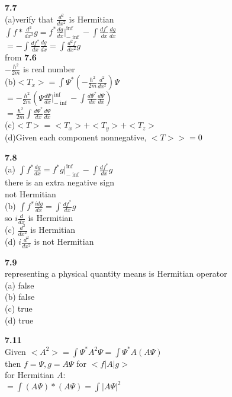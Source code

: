 \documentclass{article}
\begin{document}
\textbf{7.7}\\
(a)verify that $\frac{d^2}{dx^2}$ is Hermitian\\
$\int f* \frac{d^2}{dx^2}g = f^*\frac{dg}{dx}|^{\inf}_{-\inf} - \int \frac{df^*}{dx}\frac{dg}{dx}$\\
$ = - \int \frac{df^*}{dx}\frac{dg}{dx} = \int \frac{d^2f}{dx^2}g$\\
from \textbf{7.6}\\
$-\frac{\hbar^2}{2m}$ is real number\\
(b)$<T_x> = \int \Psi^*(-\frac{\hbar^2}{2m}\frac{d^2}{dx^2})\Psi$\\
$=-\frac{\hbar^2}{2m}(\Psi \frac{d\Psi}{dx}|^{\inf}_{-\inf} - \int \frac{d\Psi^*}{dx}\frac{d\Psi}{dx})$\\
$=\frac{\hbar^2}{2m}\int \frac{d\Psi^*}{dx}\frac{d\Psi}{dx}$\\
(c)$<T> = <T_x> + <T_y> + <T_z>$\\
(d)Given each component nonnegative, $<T> >=0$\\
\newline

\textbf{7.8}\\
(a) $\int f^*\frac{dg}{dx} = f^*g|^{\inf}_{-\inf} - \int \frac{df^*}{dx}g$\\
there is an extra negative sign\\
not Hermitian\\
(b) $\int f^*\frac{idg}{dx} = \int \frac{df^*}{dx}g$\\
so $i\frac{d}{dx}$ is Hermitian\\
(c) $\frac{d^2}{dx^2}$ is Hermitian\\
(d) $i\frac{d^2}{dx^2}$ is not Hermitian\\
\newline

\textbf{7.9}\\
representing a physical quantity means is Hermitian operator\\
(a) false\\
(b) false\\
(c) true\\
(d) true\\
\newline

\textbf{7.11}\\
Given $<A^2> = \int \Psi^* A^2\Psi = \int \Psi^* A (A\Psi)$\\
then $f = \Psi, g = A\Psi$ for $<f|A|g>$\\
for Hermitian $A$:\\
$= \int (A\Psi)*(A\Psi) = \int |A\Psi|^2$\\
\newline
\end{document}
